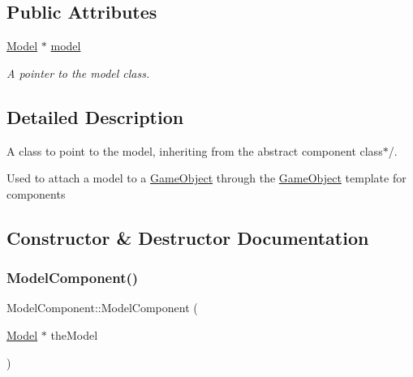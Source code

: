 \subsection*{Public Attributes}
\begin{DoxyCompactItemize}
\item 
\mbox{\label{class_model_component_a3dd9367267556f8aeb6abca61ee9dc6b}} 
\mbox{\hyperlink{class_model}{Model}} $\ast$ \mbox{\hyperlink{class_model_component_a3dd9367267556f8aeb6abca61ee9dc6b}{model}}
\begin{DoxyCompactList}\small\item\em A pointer to the model class. \end{DoxyCompactList}\end{DoxyCompactItemize}


\subsection{Detailed Description}
A class to point to the model, inheriting from the abstract component class$\ast$/. 

Used to attach a model to a \mbox{\hyperlink{class_game_object}{Game\+Object}} through the \mbox{\hyperlink{class_game_object}{Game\+Object}} template for components 

\subsection{Constructor \& Destructor Documentation}
\mbox{\label{class_model_component_ad245e043248d6c6d8ac6856a860a9887}} 
\subsubsection{\texorpdfstring{ModelComponent()}{ModelComponent()}}
{\footnotesize\ttfamily Model\+Component\+::\+Model\+Component (\begin{DoxyParamCaption}\item[{\mbox{\hyperlink{class_model}{Model}} $\ast$}]{the\+Model }\end{DoxyParamCaption})\hspace{0.3cm}{\ttfamily [inline]}}



